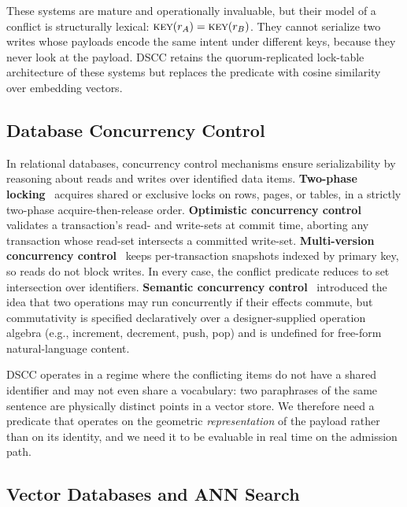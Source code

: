 \documentclass[sigconf]{acmart}
\begin{document}
These systems are mature and operationally invaluable, but their model of a
conflict is structurally lexical: $\textsc{key}(r_A)=\textsc{key}(r_B)$.
They cannot serialize two writes whose payloads encode the same intent under
different keys, because they never look at the payload. DSCC retains the
quorum-replicated lock-table architecture of these systems but replaces the
predicate with cosine similarity over embedding vectors.

\subsection{Database Concurrency Control}
\label{sec:bg-cc}

In relational databases, concurrency control mechanisms ensure
serializability by reasoning about reads and writes over identified data
items. \textbf{Two-phase locking}~\cite{gray1976granularity} acquires shared
or exclusive locks on rows, pages, or tables, in a strictly two-phase
acquire-then-release order. \textbf{Optimistic concurrency
control}~\cite{kung1981optimistic} validates a transaction's read- and
write-sets at commit time, aborting any transaction whose read-set
intersects a committed write-set. \textbf{Multi-version concurrency
control}~\cite{bernstein1983multiversion} keeps per-transaction snapshots
indexed by primary key, so reads do not block writes. In every case, the
conflict predicate reduces to set intersection over identifiers.
\textbf{Semantic concurrency control}~\cite{garcia-molina1983} introduced
the idea that two operations may run concurrently if their effects commute,
but commutativity is specified declaratively over a designer-supplied
operation algebra (e.g., increment, decrement, push, pop) and is undefined
for free-form natural-language content.

DSCC operates in a regime where the conflicting items do not have a shared
identifier and may not even share a vocabulary: two paraphrases of the same
sentence are physically distinct points in a vector store. We therefore need
a predicate that operates on the geometric \emph{representation} of the
payload rather than on its identity, and we need it to be evaluable in
real time on the admission path.

\subsection{Vector Databases and ANN Search}
\label{sec:bg-vec}
\end{document}
